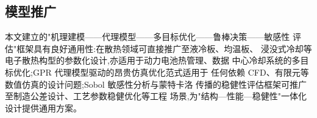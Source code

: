 \subsection{模型推广}

本文建立的"机理建模——代理模型——多目标优化——鲁棒决策——敏感性
评估"框架具有良好通用性:在散热领域可直接推广至液冷板、均温板、
浸没式冷却等电子散热构型的参数化设计,亦适用于动力电池热管理、数据
中心冷却系统的多目标优化;GPR 代理模型驱动的昂贵仿真优化范式适用于
任何依赖 CFD、有限元等数值仿真的设计问题;Sobol 敏感性分析与蒙特卡洛
传播的稳健性评估框架可推广至制造公差设计、工艺参数稳健优化等工程
场景,为"结构—性能—稳健性"一体化设计提供通用方案。
